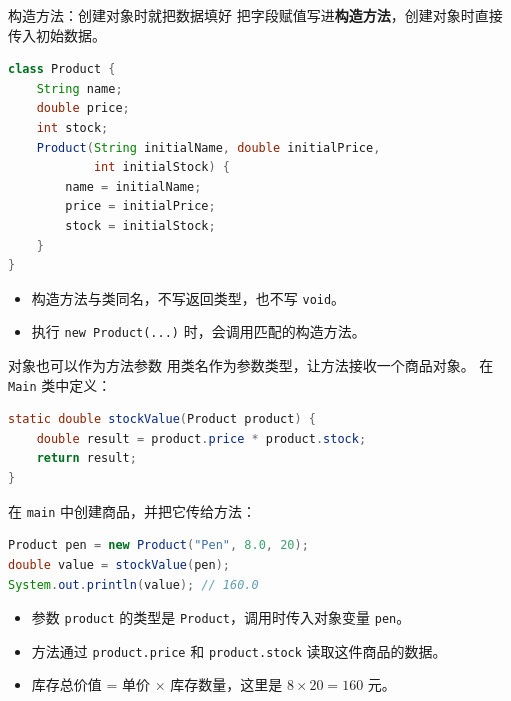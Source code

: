 \documentclass[aspectratio=169]{beamer}
\begin{document}
\begin{frame}[fragile]{构造方法：创建对象时就把数据填好}
  把字段赋值写进\textbf{构造方法}，创建对象时直接传入初始数据。
  \begin{lstlisting}[language=Java]
class Product {
    String name;
    double price;
    int stock;
    Product(String initialName, double initialPrice,
            int initialStock) {
        name = initialName;
        price = initialPrice;
        stock = initialStock;
    }
}
  \end{lstlisting}
  \begin{itemize}
    \item 构造方法与类\alert{同名}，不写返回类型，也不写 \texttt{void}。
    \item 执行 \texttt{new Product(...)} 时，会调用匹配的构造方法。
  \end{itemize}
\end{frame}

\begin{frame}[fragile]{对象也可以作为方法参数}
  用类名作为参数类型，让方法接收一个商品对象。
  在 \texttt{Main} 类中定义：
  \begin{lstlisting}[language=Java]
static double stockValue(Product product) {
    double result = product.price * product.stock;
    return result;
}
  \end{lstlisting}
  在 \texttt{main} 中创建商品，并把它传给方法：
  \begin{lstlisting}[language=Java]
Product pen = new Product("Pen", 8.0, 20);
double value = stockValue(pen);
System.out.println(value); // 160.0
  \end{lstlisting}
  \begin{itemize}
    \item 参数 \texttt{product} 的类型是 \texttt{Product}，调用时传入对象变量 \texttt{pen}。
    \item 方法通过 \texttt{product.price} 和 \texttt{product.stock} 读取这件商品的数据。
    \item 库存总价值 = 单价 $\times$ 库存数量，这里是 $8 \times 20 = 160$ 元。
  \end{itemize}
\end{frame}
\end{document}
